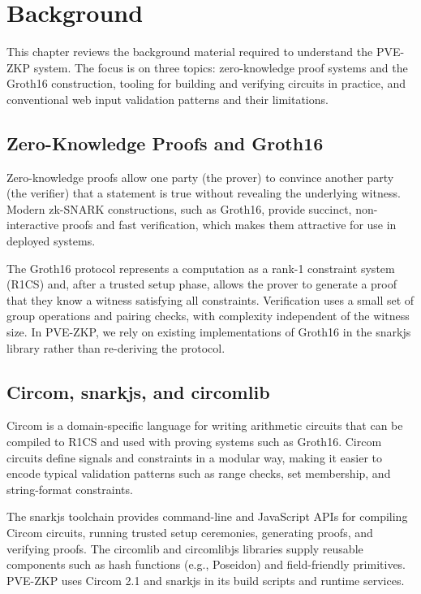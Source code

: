 
\chapter{Background}

This chapter reviews the background material required to understand the PVE-ZKP
system. The focus is on three topics: zero-knowledge proof systems and the
Groth16 construction, tooling for building and verifying circuits in practice,
and conventional web input validation patterns and their limitations.

\section{Zero-Knowledge Proofs and Groth16}

Zero-knowledge proofs allow one party (the prover) to convince another party
(the verifier) that a statement is true without revealing the underlying
witness. Modern zk-SNARK constructions, such as Groth16, provide succinct,
non-interactive proofs and fast verification, which makes them attractive for
use in deployed systems.

The Groth16 protocol represents a computation as a rank-1 constraint system
(R1CS) and, after a trusted setup phase, allows the prover to generate a proof
that they know a witness satisfying all constraints. Verification uses a small
set of group operations and pairing checks, with complexity independent of the
witness size. In PVE-ZKP, we rely on existing implementations of Groth16 in the
snarkjs library rather than re-deriving the protocol.

\section{Circom, snarkjs, and circomlib}

Circom is a domain-specific language for writing arithmetic circuits that can
be compiled to R1CS and used with proving systems such as Groth16. Circom
circuits define signals and constraints in a modular way, making it easier to
encode typical validation patterns such as range checks, set membership, and
string-format constraints.

The snarkjs toolchain provides command-line and JavaScript APIs for compiling
Circom circuits, running trusted setup ceremonies, generating proofs, and
verifying proofs. The circomlib and circomlibjs libraries supply reusable
components such as hash functions (e.g., Poseidon) and field-friendly
primitives. PVE-ZKP uses Circom 2.1 and snarkjs in its build scripts and
runtime services.

